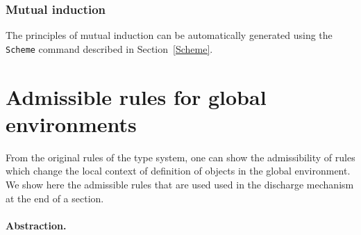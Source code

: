 
\subsubsection{Mutual induction}

The principles of mutual induction can be automatically generated 
using the {\tt Scheme} command described in Section~\ref{Scheme}.

\section{Admissible rules for global environments}

From the original rules of the type system, one can show the
admissibility of rules which change the local context of definition of
objects in the global environment. We show here the admissible rules
that are used used in the discharge mechanism at the end of a section.





\paragraph{Abstraction.}

